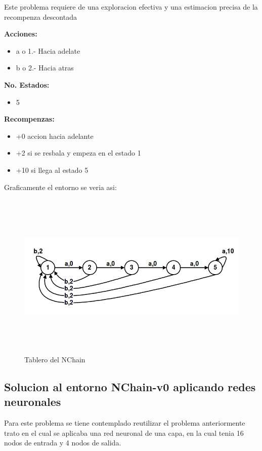 Este problema requiere de una exploracion efectiva y una estimacion precisa de la recompenza descontada

\textbf{Acciones:}

\begin{itemize}
    \item a o 1.- Hacia adelate
    
    \item b o 2.- Hacia atras
    
\end{itemize}

\textbf{No. Estados:}

\begin{itemize}
    \item 5
\end{itemize}

\textbf{Recompenzas:}

\begin{itemize}
    \item +0 accion hacia adelante
    \item +2 si se resbala y empeza en el estado 1
    \item +10 si llega al estado 5
\end{itemize}

Graficamente el entorno se veria asi:

\begin{figure}[ht]
	\centering
	\includegraphics*[width=12cm,height=8cm,keepaspectratio]{figuras/nchain} 
	\caption{Tablero del NChain}
	\label{fig:N-Chain}
\end{figure}


\subsection{Solucion al entorno NChain-v0 aplicando redes neuronales}
Para este problema se tiene contemplado reutilizar el problema anteriormente trato en el cual se aplicaba una red neuronal de una capa, en la cual tenia 16 nodos de entrada y 4 nodos de salida.

